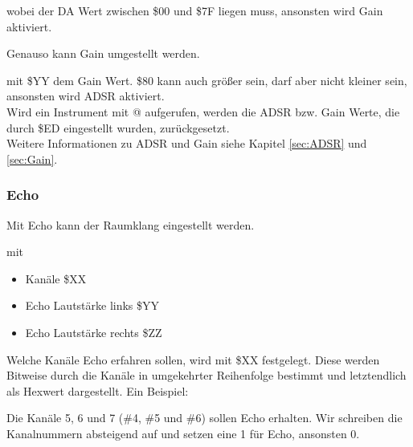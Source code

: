 

\medskip

wobei der DA Wert zwischen \$00 und \$7F liegen muss, ansonsten wird Gain aktiviert.

\bigskip

Genauso kann Gain umgestellt werden.

\medskip



\medskip

mit \$YY dem Gain Wert. \$80 kann auch größer sein, darf aber nicht kleiner sein, ansonsten wird ADSR aktiviert. \\

Wird ein Instrument mit @ aufgerufen, werden die ADSR bzw. Gain Werte, die durch \$ED eingestellt wurden, zurückgesetzt. \\
Weitere Informationen zu ADSR und Gain siehe Kapitel \ref{sec:ADSR} und \ref{sec:Gain}.

\subsubsection{Echo}

Mit Echo kann der Raumklang eingestellt werden.

\medskip



\medskip

mit

\begin{itemize}
	\item Kanäle \$XX
	\item Echo Lautstärke links \$YY
	\item Echo Lautstärke rechts \$ZZ
\end{itemize}

Welche Kanäle Echo erfahren sollen, wird mit \$XX festgelegt. Diese werden Bitweise durch die Kanäle in umgekehrter Reihenfolge bestimmt und letztendlich als Hexwert dargestellt. Ein Beispiel:

\bigskip

Die Kanäle 5, 6 und 7 (\#4, \#5 und \#6) sollen Echo erhalten. Wir schreiben die Kanalnummern absteigend auf und setzen eine 1 für Echo, ansonsten 0.


